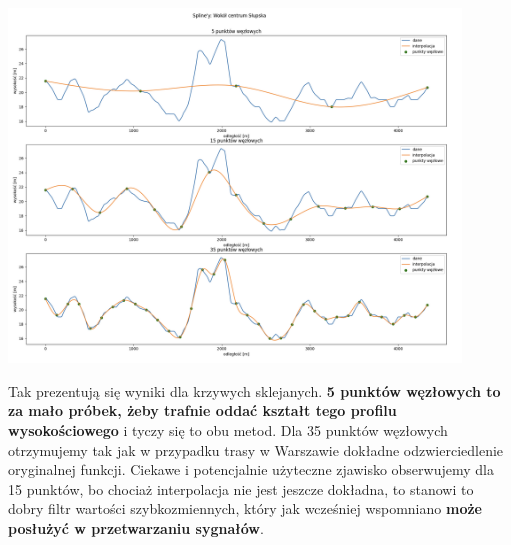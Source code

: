\documentclass{article}
\begin{document}
 \begin{center}
	\includegraphics[width=12cm]{spline_slupsk_uniform}
\end{center}
Tak prezentują się wyniki dla krzywych sklejanych. \textbf{5 punktów węzłowych to za mało próbek, żeby trafnie oddać kształt tego profilu wysokościowego} i tyczy się 
to obu metod. Dla 35 punktów węzłowych otrzymujemy tak jak w przypadku trasy w Warszawie dokładne odzwierciedlenie oryginalnej funkcji. 
Ciekawe i potencjalnie użyteczne zjawisko obserwujemy dla 15 punktów, bo chociaż interpolacja nie jest jeszcze dokładna, to stanowi to dobry filtr
wartości szybkozmiennych, który jak wcześniej wspomniano \textbf{może posłużyć w przetwarzaniu sygnałów}.
\end{document}
